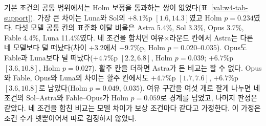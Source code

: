 \begin{table}[h]
\centering
\caption{공통 상태 범위의 쌍별 이탈 비율 차이. 차이는 $C$가 낮은 모델에서 높은 모델을 뺀 값(\%p)이며, 공통 칸의 겹침 가중 평균이다. 대괄호는 시드 재표집 95\% 구간, Holm $p$는 정확 부호 뒤집기 검정의 열 쌍 Holm 보정값이다. $^{*}$는 Holm $p<0.05$다. $+$활주 칸에서 Astra가 든 쌍은 공통 칸이 없어 비교하지 않았다. 다섯 모델이 모두 관측된 칸에 든 기회의 비율은 여유$\times$라운드 칸에서 기본 조건 98.0--100\%, 네 조건 94.9--100\%였고, $+$활주 칸에서는 두 경우 모두 0\%였다.}
\label{val:w4-tab-support}
\small
\setlength{\tabcolsep}{3pt}
\resizebox{\linewidth}{!}{}
\end{table}

기본 조건의 공통 범위에서는 Holm 보정을 통과하는 쌍이 없었다(표~\ref{val:w4-tab-support}). 가장 큰 차이는 Luna와 Sol의 $+8.1$\%p $[1.6, 14.3]$였고 Holm $p=0.234$였다. 다섯 모델 공통 칸의 표준화 이탈 비율은 Astra 5.4\%, Sol 3.3\%, Opus 3.7\%, Fable 4.4\%, Luna 11.4\%였다. 네 조건을 합치면 여유$\times$라운드 칸에서 Astra는 다른 네 모델보다 덜 떠났다(차이 $+3.2$에서 $+9.7$\%p, Holm $p=0.020$--$0.035$). Opus도 Fable과 Luna보다 덜 떠났다($+4.7$\%p $[2.2, 6.8]$, Holm $p=0.039$; $+6.7$\%p $[3.6, 10.8]$, Holm $p=0.027$). 활주 칸을 더하면 Astra가 든 비교는 할 수 없다. Opus와 Fable, Opus와 Luna의 차이는 활주 칸에서도 $+4.7$\%p $[1.7, 7.6]$, $+6.7$\%p $[3.6, 10.8]$로 남았다(Holm $p=0.049$, $0.035$). 여유 구간을 여섯 개로 잘게 나누면 네 조건의 Sol--Astra와 Fable--Opus가 Holm $p=0.059$로 경계를 넘었고, 나머지 판정은 같았다. 네 조건을 합친 비교는 모델 차이가 보상 조건마다 같다고 가정한다. 이 가정은 조건 수가 넷뿐이어서 따로 검정하지 않았다.

\begin{table}[h]
\centering
\caption{이탈 예측의 시드 제외 검증. 한 시드의 다섯 판(네 조건에서는 스무 판)을 빼고 적합한 뒤 뺀 판을 예측하기를 열 번 반복했다. 비용은 자기 이전 TALK 비용(앞선 라운드 평균), 직전 라운드 TALK 비용, 활주 라운드의 세 로그 항이며, 1라운드의 앞 두 항은 모델 평균으로 채웠다. 보정 기울기는 관측 이탈을 예측 로짓에 회귀한 기울기로 1이 이상적이다. 십분위 오차는 예측 확률 십분위마다 평균 예측과 관측 비율의 차이를 기회 수로 가중 평균한 값이다. 네 조건의 모든 설명 변수에는 조건 효과가 들어 있다.}
\label{val:w4-tab-loso}
\small
\setlength{\tabcolsep}{4pt}

\end{table}

